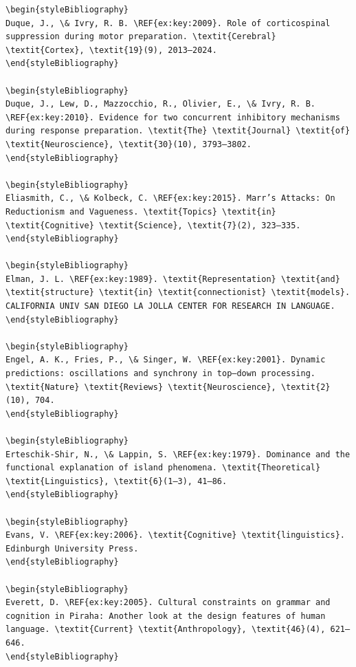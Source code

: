 \begin{verbatim}
\begin{styleBibliography}
Duque, J., \& Ivry, R. B. \REF{ex:key:2009}. Role of corticospinal suppression during motor preparation. \textit{Cerebral} \textit{Cortex}, \textit{19}(9), 2013–2024.
\end{styleBibliography}

\begin{styleBibliography}
Duque, J., Lew, D., Mazzocchio, R., Olivier, E., \& Ivry, R. B. \REF{ex:key:2010}. Evidence for two concurrent inhibitory mechanisms during response preparation. \textit{The} \textit{Journal} \textit{of} \textit{Neuroscience}, \textit{30}(10), 3793–3802.
\end{styleBibliography}

\begin{styleBibliography}
Eliasmith, C., \& Kolbeck, C. \REF{ex:key:2015}. Marr’s Attacks: On Reductionism and Vagueness. \textit{Topics} \textit{in} \textit{Cognitive} \textit{Science}, \textit{7}(2), 323–335.
\end{styleBibliography}

\begin{styleBibliography}
Elman, J. L. \REF{ex:key:1989}. \textit{Representation} \textit{and} \textit{structure} \textit{in} \textit{connectionist} \textit{models}. CALIFORNIA UNIV SAN DIEGO LA JOLLA CENTER FOR RESEARCH IN LANGUAGE.
\end{styleBibliography}

\begin{styleBibliography}
Engel, A. K., Fries, P., \& Singer, W. \REF{ex:key:2001}. Dynamic predictions: oscillations and synchrony in top–down processing. \textit{Nature} \textit{Reviews} \textit{Neuroscience}, \textit{2}(10), 704.
\end{styleBibliography}

\begin{styleBibliography}
Erteschik-Shir, N., \& Lappin, S. \REF{ex:key:1979}. Dominance and the functional explanation of island phenomena. \textit{Theoretical} \textit{Linguistics}, \textit{6}(1–3), 41–86.
\end{styleBibliography}

\begin{styleBibliography}
Evans, V. \REF{ex:key:2006}. \textit{Cognitive} \textit{linguistics}. Edinburgh University Press.
\end{styleBibliography}

\begin{styleBibliography}
Everett, D. \REF{ex:key:2005}. Cultural constraints on grammar and cognition in Piraha: Another look at the design features of human language. \textit{Current} \textit{Anthropology}, \textit{46}(4), 621–646.
\end{styleBibliography}


\end{verbatim}
